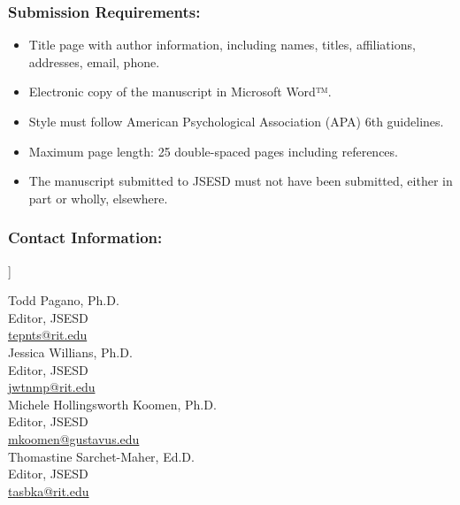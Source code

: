 \documentclass[11pt]{sig-alternate}
\begin{document}
\begin{@twocolumnfalse}
\subsubsection*{Submission Requirements:}

\begin{itemize}
    \item Title page with author information, including names, titles, affiliations, addresses, email, phone.
    \item Electronic copy of the manuscript in Microsoft Word™.
    \item Style must follow American Psychological Association (APA) 6th guidelines.
    \item Maximum page length: 25 double-spaced pages including references.
    \item The manuscript submitted to JSESD must not have been submitted, either in part or wholly, elsewhere.
\end{itemize}

\subsubsection*{Contact Information:}

\end{@twocolumnfalse}]

Todd Pagano, Ph.D.\\Editor, JSESD\\\href{mailto:tepnts@rit.edu}{tepnts@rit.edu}\\

Jessica Willians, Ph.D.\\Editor, JSESD\\\href{mailto:jwtnmp@rit.edu}{jwtnmp@rit.edu}\\

\newpage
Michele Hollingsworth Koomen, Ph.D.\\Editor, JSESD\\\href{mailto:mkoomen@gustavus.edu}{mkoomen@gustavus.edu}\\

Thomastine Sarchet-Maher, Ed.D.\\Editor, JSESD\\\href{mailto:tasbka@rit.edu}{tasbka@rit.edu}\\
\end{document}
